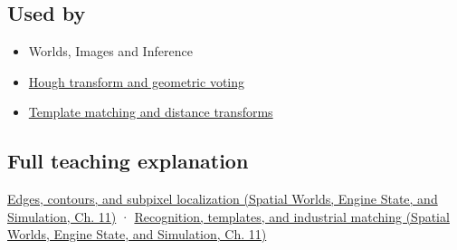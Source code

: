 \subsection{Used by}\label{appendix-36022286b03e-used-by}

\begin{itemize}
\tightlist
\item
  {Worlds, Images and Inference}
\item
  \hyperref[appendix-a5b0383b3b3e]{Hough transform and geometric voting}
\item
  \hyperref[appendix-5fb4af80d1c7]{Template matching and distance transforms}
\end{itemize}

\subsection{Full teaching explanation}\label{appendix-36022286b03e-full-teaching-explanation}

\href{../05-Spatial-Worlds-Engine-State-and-Simulation/main.pdf\#nameddest=04-visual-computing-ii-ch030-edges-contours-and-subpixel-localization}{Edges, contours, and subpixel localization (Spatial Worlds, Engine State, and Simulation, Ch. 11)} · \href{../05-Spatial-Worlds-Engine-State-and-Simulation/main.pdf\#nameddest=04-visual-computing-ii-ch030-recognition-templates-and-industrial-matching}{Recognition, templates, and industrial matching (Spatial Worlds, Engine State, and Simulation, Ch. 11)}
